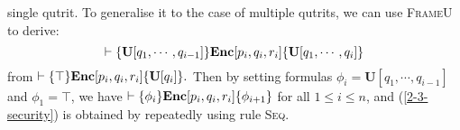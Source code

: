 \documentclass[conference,compsoc, 10pt]{IEEEtran}
\newcommand {\unia } {{\mathbf{U}}}
\def\>{\ensuremath{\rangle}}
\newcommand {\perm} {\mathbf{Perm}}
\begin{document}
	\noindent single qutrit. To generalise it to the case of multiple qutrits, we can use \textsc{FrameU} to derive:
	$$\vdash\{\unia[q_1,\cdots,q_{i-1}]\}{\bf Enc}[p_i,q_i,r_i]\{\unia[q_1,\cdots,q_i]\}$$
	from $\vdash\{\top\}{\bf Enc}[p_i,q_i,r_i]\{\unia[q_i]\}.$ Then by setting
  formulas $\phi_i = \unia[q_1,\cdots,q_{i-1}]$ and $\phi_1 = \top$,  we have
  $\vdash\{\phi_i\}{\bf Enc}[p_i,q_i,r_i]\{\phi_{i+1}\}$ for all $1\le i\le n$,
  and (\ref{2-3-security}) is obtained by repeatedly using rule \textsc{Seq}.
	
	
\end{document}
